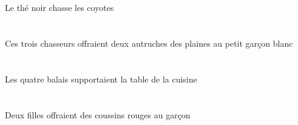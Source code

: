 \begin{exe}
   \DEFSgErgP{}   \noirBSgP{}   \theBSgErgP{}   \DEFPlAbsP{}   \coyoteCPlAbsP{}  \chasserVtPrsCPlP{} \\
   \DEFSgErgG{}   \noirBSgG{}   \theBSgErgG{}   \DEFPlAbsG{}   \coyoteCPlAbsG{}  \chasserVtPrsCPlG{} \\
 Le thé noir chasse les coyotes
\ex\glll
   \DEMPlErg{}   \troisCPl{}   \chasseurCPlErg{}    \DEFSgObl{}   \petitDSg{}   \blancDSg{}   \garconDSgObl{}   \A{}   \INDDuAbs{}    \DEFPlObl{}   \plaineAPlObl{}   \DE{}   \autrucheBDuAbs{}  \offrirVdPstBDu{} \\
   \DEMPlErgP{}   \troisCPlP{}   \chasseurCPlErgP{}    \DEFSgOblP{}   \petitDSgP{}   \blancDSgP{}   \garconDSgOblP{}   \AP{}   \INDDuAbsP{}    \DEFPlOblP{}   \plaineAPlOblP{}   \DEP{}   \autrucheBDuAbsP{}  \offrirVdPstBDuP{} \\
   \DEMPlErgG{}   \troisCPlG{}   \chasseurCPlErgG{}    \DEFSgOblG{}   \petitDSgG{}   \blancDSgG{}   \garconDSgOblG{}   \AG{}   \INDDuAbsG{}    \DEFPlOblG{}   \plaineAPlOblG{}   \DEG{}   \autrucheBDuAbsG{}  \offrirVdPstBDuG{} \\
 Ces trois chasseurs offraient deux autruches des plaines au petit garçon blanc
\ex\glll
   \DEFPlErg{}   \quatreAPl{}   \balaiAPlErg{}   \DEFSgAbs{}    \DEFSgObl{}   \cuisineDSgObl{}   \DE{}   \tableDSgAbs{}  \supporterVtPstDSg{} \\
   \DEFPlErgP{}   \quatreAPlP{}   \balaiAPlErgP{}   \DEFSgAbsP{}    \DEFSgOblP{}   \cuisineDSgOblP{}   \DEP{}   \tableDSgAbsP{}  \supporterVtPstDSgP{} \\
   \DEFPlErgG{}   \quatreAPlG{}   \balaiAPlErgG{}   \DEFSgAbsG{}    \DEFSgOblG{}   \cuisineDSgOblG{}   \DEG{}   \tableDSgAbsG{}  \supporterVtPstDSgG{} \\
 Les quatre balais supportaient la table de la cuisine
\ex\glll
   \INDDuErg{}   \filleCDuErg{}    \DEFSgObl{}   \garconDSgObl{}   \A{}   \INDPlAbs{}   \rougeBPl{}   \coussinBPlAbs{}  \offrirVdPstBPl{} \\
   \INDDuErgP{}   \filleCDuErgP{}    \DEFSgOblP{}   \garconDSgOblP{}   \AP{}   \INDPlAbsP{}   \rougeBPlP{}   \coussinBPlAbsP{}  \offrirVdPstBPlP{} \\
   \INDDuErgG{}   \filleCDuErgG{}    \DEFSgOblG{}   \garconDSgOblG{}   \AG{}   \INDPlAbsG{}   \rougeBPlG{}   \coussinBPlAbsG{}  \offrirVdPstBPlG{} \\
 Deux filles offraient des coussins rouges au garçon
\ex\glll
   \DEFDuErg{}   \chasseurCDuErg{}   \DEFPlAbs{}    \INDSgObl{}   \NabilDSgObl{}   \DE{}   \coyoteCPlAbs{}  \supporterVtPstCPl{} \\

\end{exe}
